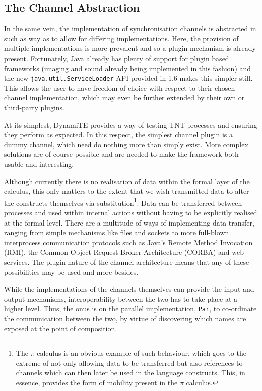 \subsection{The Channel Abstraction}
\label{channels}

In the same vein, the implementation of synchronisation channels is
abstracted in such as way as to allow for differing implementations.
Here, the provision of multiple implementations is more prevalent and so
a plugin mechanism is already present.  Fortunately, Java already has
plenty of support for plugin based frameworks (imaging and sound already
being implemented in this fashion) and the new
\texttt{java.util.ServiceLoader} API provided in 1.6 makes this simpler
still.  This allows the user to have freedom of choice with respect to
their chosen channel implementation, which may even be further extended
by their own or third-party plugins.

At its simplest, DynamiTE provides a way of testing TNT processes and
ensuring they perform as expected.  In this respect, the simplest
channel plugin is a dummy channel, which need do nothing more than
simply exist.  More complex solutions are of course possible and are
needed to make the framework both usable and interesting.  

Although currently there is no realisation of data within the formal
layer of the calculus, this only matters to the extent that we wish
transmitted data to alter the constructs themselves via
substitution\footnote{The $\pi$ calculus \cite{picalctutorial} is an
obvious example of such behaviour, which goes to the extreme of not only
allowing data to be transferred but also references to channels which
can then later be used in the language constructs.  This, in essence,
provides the form of mobility present in the $\pi$ calculus.}.  Data can
be transferred between processes and used within internal actions
without having to be explicitly realised at the formal level.  There are
a multitude of ways of implementing data transfer, ranging from simple
mechanisms like files and sockets to more full-blown interprocess
communication protocols such as Java's Remote Method Invocation (RMI),
the Common Object Request Broker Architecture (CORBA) and web services.
The plugin nature of the channel architecture means that any of these
possibilities may be used and more besides.

While the implementations of the channels themselves can provide the
input and output mechanisms, interoperability between the two has to
take place at a higher level.  Thus, the onus is on the parallel
implementation, \texttt{Par}, to co-ordinate the communication between
the two, by virtue of discovering which names are exposed at the point
of composition.

